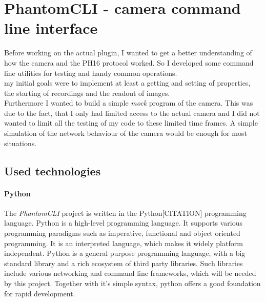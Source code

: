 \section{PhantomCLI - camera command line interface}
Before working on the actual plugin, I wanted to get a better understanding of how the camera and the PH16 protocol worked. So I developed some command line utilities for testing and handy common operations.\\
my initial goals were to implement at least a getting and setting of properties, the starting of recordings and the readout of images.\\
Furthermore I wanted to build a simple \textit{mock} program of the camera. This was due to the fact, that I only had limited access to the actual camera and I did not wanted to limit all the testing of my code to these limited time frames. A simple simulation of the network behaviour of the camera would be enough for most situations.

\subsection{Used technologies} \label{sec:phantomcli_used_tech}

\paragraph{Python}
The \textit{PhantomCLI} project is written in the Python[CITATION] programming language. Python is a high-level programming language. It supports various programming paradigms such as imperative, functional and object oriented programming. It is an interpreted language, which makes it widely platform independent. Python is a general purpose programming language, with a big standard library and a rich ecosystem of third party libraries. Such libraries include various networking and command line frameworks, which will be needed by this project. Together with it's simple syntax, python offers a good foundation for rapid development.


